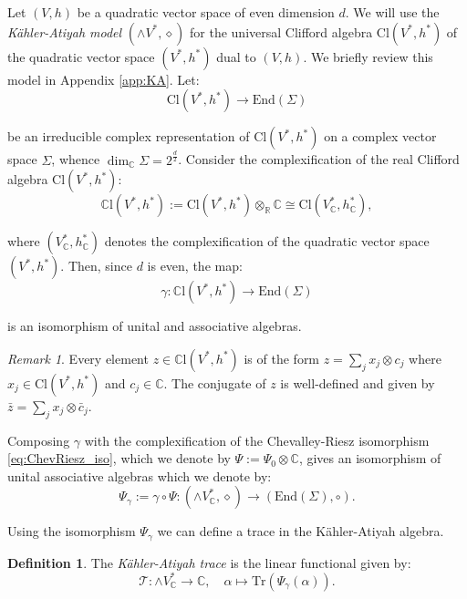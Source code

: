 \documentclass[10pt,a4paper,twoside,reqno]{amsart}
\theoremstyle{plain}
\theoremstyle{definition}
\newtheorem{definition}[thm]{Definition}
\theoremstyle{remark}
\newtheorem{remark}[thm]{Remark}
\newcommand{\End}{\mathrm{End}}
\def\C{\mathbb{C}}
\def\R{\mathbb{R}}
\newcommand{\Tr}{\mathrm{Tr}}
\def\Cl{\mathrm{Cl}}
\def\R{\mathbb{R}}
\begin{document}
Let $(V,h)$ be a quadratic vector space of even dimension $d$. We will use the \emph{Kähler-Atiyah model} $(\wedge V^*,\diamond)$ for the universal Clifford algebra $\Cl(V^*,h^*)$ of the quadratic vector space $(V^*,h^*)$ dual to $(V,h)$. We briefly review this model in Appendix \ref{app:KA}. Let: 
\begin{equation*}
\mathrm{Cl}(V^*,h^*)\to\End(\Sigma)   
\end{equation*}

\noindent
be an irreducible complex representation of $\mathrm{Cl}(V^*,h^*)$ on a complex vector space $\Sigma$, whence $\dim_\C\Sigma=2^{\frac{d}{2}}$. Consider the complexification of the real Clifford algebra $\mathrm{Cl}(V^*,h^*)$: 
\begin{equation*}
\C\mathrm{l}(V^*,h^*):=\mathrm{Cl}(V^*,h^*)\otimes_\R\C\cong\mathrm{Cl}(V^*_\C,h^*_\C),
\end{equation*}

\noindent
where $(V^*_\C,h^*_\C)$ denotes the complexification of the quadratic vector space $(V^*,h^*)$. Then, since $d$ is even, the map:
\begin{equation*}
\gamma\colon\C\mathrm{l}(V^*,h^*)\to\End(\Sigma)
\end{equation*}

\noindent
is an isomorphism of unital and associative algebras.

\begin{remark}
Every element $z\in\C\mathrm{l}(V^*,h^*)$ is of the form $z=\sum_j x_j\otimes c_j$ where $x_j\in\mathrm{Cl}(V^*,h^*)$ and $c_j\in\C$. The conjugate of $z$ is well-defined and given by $\bar{z}=\sum_jx_j\otimes\bar{c}_j$.
\end{remark}

\noindent
Composing $\gamma$ with the complexification of the Chevalley-Riesz isomorphism \eqref{eq:ChevRiesz_iso}, which we denote by $\Psi:=\Psi_0\otimes\C$, gives an isomorphism of unital associative algebras which we denote by: 
\begin{equation*}
    \Psi_\gamma:=\gamma\circ\Psi\colon(\wedge V^*_\C,\diamond)\to(\End(\Sigma),\circ).
\end{equation*}

\noindent
Using the isomorphism $\Psi_\gamma$ we can define a trace in the Kähler-Atiyah algebra.

\begin{definition}
The \emph{Kähler-Atiyah trace} is the linear functional given by: 
\begin{equation*}
\mathcal{T}\colon \wedge V^*_\C\to\C,\quad\alpha\mapsto\Tr(\Psi_\gamma(\alpha)).
\end{equation*}
\end{definition}
\end{document}
